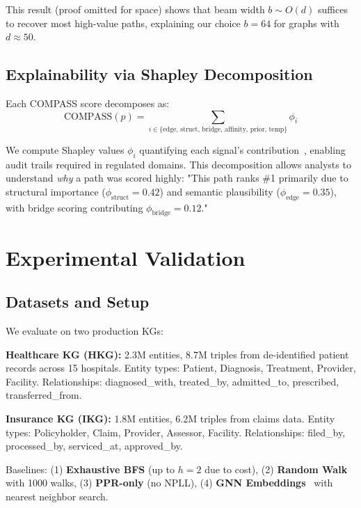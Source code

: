 \documentclass[10pt,twocolumn]{article}
\begin{document}
This result (proof omitted for space) shows that beam width $b \sim O(d)$ suffices to recover most high-value paths, explaining our choice $b=64$ for graphs with $d \approx 50$.

\subsection{Explainability via Shapley Decomposition}

Each COMPASS score decomposes as:
\begin{equation}
\text{COMPASS}(p) = \sum_{i \in \{\text{edge, struct, bridge, affinity, prior, temp}\}} \phi_i
\end{equation}

We compute Shapley values $\phi_i$ quantifying each signal's contribution~\cite{lundberg2017unified}, enabling audit trails required in regulated domains. This decomposition allows analysts to understand \textit{why} a path was scored highly: "This path ranks \#1 primarily due to structural importance ($\phi_{\text{struct}}=0.42$) and semantic plausibility ($\phi_{\text{edge}}=0.35$), with bridge scoring contributing $\phi_{\text{bridge}}=0.12$."

\section{Experimental Validation}

\subsection{Datasets and Setup}

We evaluate on two production KGs:

\textbf{Healthcare KG (HKG):} 2.3M entities, 8.7M triples from de-identified patient records across 15 hospitals. Entity types: Patient, Diagnosis, Treatment, Provider, Facility. Relationships: diagnosed\_with, treated\_by, admitted\_to, prescribed, transferred\_from.

\textbf{Insurance KG (IKG):} 1.8M entities, 6.2M triples from claims data. Entity types: Policyholder, Claim, Provider, Assessor, Facility. Relationships: filed\_by, processed\_by, serviced\_at, approved\_by.

Baselines: (1) \textbf{Exhaustive BFS} (up to $h=2$ due to cost), (2) \textbf{Random Walk} with 1000 walks, (3) \textbf{PPR-only} (no NPLL), (4) \textbf{GNN Embeddings}~\cite{schlichtkrull2018modeling} with nearest neighbor search.
\end{document}
